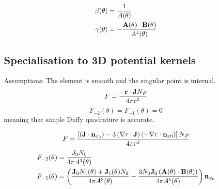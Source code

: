 \documentclass[a4paper,11pt]{article}
\begin{document}
\begin{align}
\beta(\theta) &= \frac{1}{A(\theta)} \\
\gamma(\theta) &= -\frac{{\bf A}(\theta) \cdot {\bf B}(\theta)}{A^4(\theta)}
\end{align}


\subsection{Specialisation to 3D potential kernels}

Assumptions: The element is smooth and the singular point is internal.
%
\begin{equation}
F = \frac{-{\bf r} \cdot {\bf J} N \rho}{4\pi r^3}
\end{equation}
%
\begin{equation}
F_{-2}(\theta) = F_{-1}(\theta) = 0
\end{equation}
%
meaning that simple Duffy quadrature is accurate.

\begin{equation}
F = \frac{
\left[
\left({\bf J} \cdot {\bf n}_{x_0}\right)
-
3 \left(\nabla r \cdot {\bf J}\right) \left(-\nabla r \cdot {\bf n}_{x0}\right)
\right] N \rho
}{
4\pi r^3
}
\end{equation}
%
\begin{align}
F_{-2}(\theta) &= \frac{J_0 N_0}{4\pi A^3(\theta)} \\
F_{-1}(\theta) &= \left(\frac{{\bf J}_0 N_1(\theta) + {\bf J}_1(\theta) N_0}{4\pi A^3(\theta)}
-\frac{3 N_0 {\bf J}_0 \left({\bf A}(\theta) \cdot {\bf B}(\theta)\right)}{4\pi A^5(\theta)}\right) {\bf n}_{x_0}
\end{align}
\end{document}
